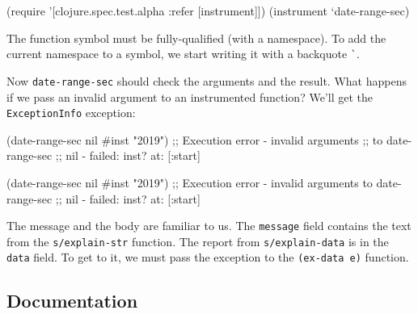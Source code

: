 \else

\begin{english}
  \begin{clojure}
(require '[clojure.spec.test.alpha :refer [instrument]])
(instrument `date-range-sec)
  \end{clojure}
\end{english}

\fi


The function symbol must be fully-qualified (with a namespace). To add the current namespace to a symbol, we start writing it with a backquote \verb|`|.

Now \verb|date-range-sec| should check the arguments and the result. What happens if we pass an invalid argument to an instrumented function? We'll get the \verb|ExceptionInfo| exception:

\ifx\DEVICETYPE\MOBILE

\begin{english}
  \begin{clojure}
(date-range-sec nil #inst "2019")
;; Execution error - invalid arguments
;; to date-range-sec
;; nil - failed: inst? at: [:start]
  \end{clojure}
\end{english}

\else

\begin{english}
  \begin{clojure}
(date-range-sec nil #inst "2019")
;; Execution error - invalid arguments to date-range-sec
;; nil - failed: inst? at: [:start]
  \end{clojure}
\end{english}

\fi


The message and the body are familiar to us. The \verb|message| field contains the text from the \verb|s/explain-str| function. The report from \verb|s/explain-data| is in the \verb|data| field. To get to it, we must pass the exception to the \verb|(ex-data e)| function.

\subsection{Documentation}


